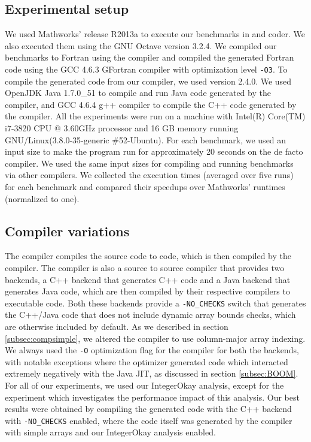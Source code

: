 \subsection{Experimental setup}

We used Mathworks' \matlab release R2013a to execute our benchmarks in \matlab
and \matlab coder. We also executed them using the GNU Octave version 3.2.4. We
compiled our benchmarks to Fortran using the \mctwofor compiler and compiled
the generated Fortran code using the GCC 4.6.3 GFortran compiler with
optimization level \texttt{-O3}. To compile the generated \xten code from our
\mixten compiler, we used \xten version 2.4.0. We used OpenJDK Java 1.7.0\_51
to compile and run Java code generated by the \xten compiler, and GCC 4.6.4 g++
compiler to compile the C++ code generated by the \xten compiler. All the
experiments were run on a machine with Intel(R) Core(TM) i7-3820 CPU @ 3.60GHz
processor and 16 GB memory running GNU/Linux(3.8.0-35-generic \#52-Ubuntu). For
each benchmark, we used an input size to make the program run for approximately
20 seconds on the de facto \matlab compiler. We used the same input sizes for
compiling and running benchmarks via other compilers. We collected the
execution times (averaged over five runs) for each benchmark and compared their
speedups over Mathworks' \matlab runtimes (normalized to one). 

\subsection{\xten Compiler variations}

The \mixten compiler compiles the source \matlab code to \xten code, which is
then compiled by the \xten compiler. The \xten compiler is also a source to 
source compiler that provides two
backends, a C++ backend that generates C++ code and a Java backend that
generates Java code, which are then compiled by their respective compilers to
executable code.  Both these backends provide a \texttt{-NO\_CHECKS}
switch that generates the C++/Java code that does not include dynamic
array bounds checks, which are otherwise included by default.  As we
described in section \ref{subsec:compsimple}, we altered the \xten compiler to use
column-major array indexing.  We always used the \texttt{-O}
optimization flag for the \xten compiler for both the backends, with
notable exceptions where the \xten optimizer generated code which
interacted extremely negatively with the Java JIT, as discussed in
section \ref{subsec:BOOM}.  For all of our experiments, we used our IntegerOkay
analysis, except for the experiment which investigates the performance
impact of this analysis. Our best results were obtained by compiling the
generated \xten code with the C++ backend with \texttt{-NO\_CHECKS}
enabled, where the \xten code itself was generated by the \mixten
compiler with simple arrays and our IntegerOkay analysis enabled. 

